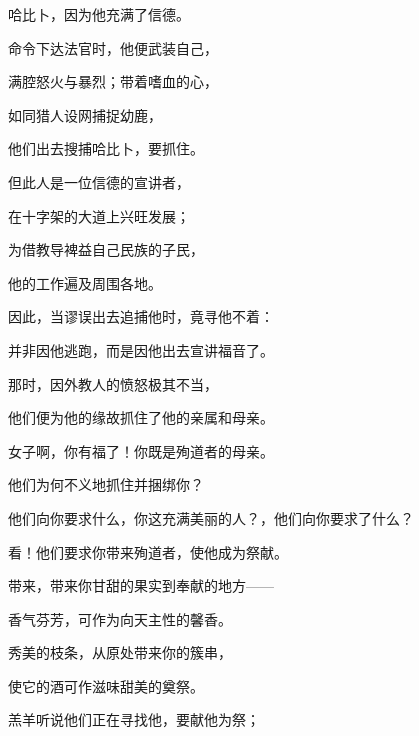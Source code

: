 哈比卜，因为他充满了信德。\par

命令下达法官时，他便武装自己，\par

满腔怒火与暴烈；带着嗜血的心，\par

如同猎人设网捕捉幼鹿，\par

他们出去搜捕哈比卜，要抓住。\par

但此人是一位信德的宣讲者，\par

在十字架的大道上兴旺发展；\par

为借教导裨益自己民族的子民，\par

他的工作遍及周围各地。\par

因此，当谬误出去追捕他时，竟寻他不着：\par

并非因他逃跑，而是因他出去宣讲福音了。\par

那时，因外教人的愤怒极其不当，\par

他们便为他的缘故抓住了他的亲属和母亲。\par

女子啊，你有福了！你既是殉道者的母亲。\par

他们为何不义地抓住并捆绑你？\par

他们向你要求什么，你这充满美丽的人？，他们向你要求了什么？\par

看！他们要求你带来殉道者，使他成为祭献。\par

带来，带来你甘甜的果实到奉献的地方——\par

香气芬芳，可作为向天主性的馨香。\par

秀美的枝条，从原处带来你的簇串，\par

使它的酒可作滋味甜美的奠祭。\par

羔羊听说他们正在寻找他，要献他为祭；\par

